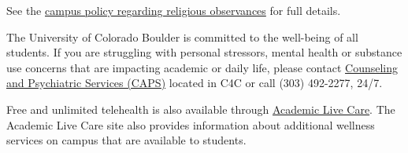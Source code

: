 See the \href{http://www.colorado.edu/policies/observance-religious-holidays-and-absences-classes-andor-exams}{campus policy regarding religious observances} for full details.

\item[Mental Health and Wellness:]
The University of Colorado Boulder is committed to the well-being of all students. If you are struggling with personal stressors, mental health or substance use concerns that are impacting academic or daily life, please contact \href{https://www.colorado.edu/counseling/}{Counseling and Psychiatric Services (CAPS)} located in C4C or call (303) 492-2277, 24/7. 

Free and unlimited telehealth is also available through \href{https://www.colorado.edu/health/academiclivecare}{Academic Live Care}. The Academic Live Care site also provides information about additional wellness services on campus that are available to students.
